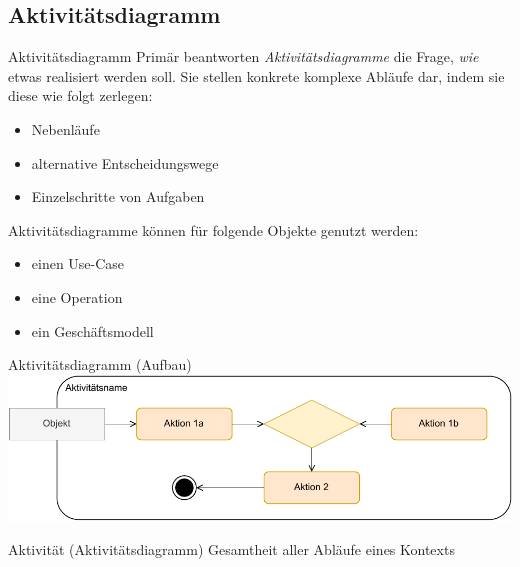 \subsection{Aktivitätsdiagramm}

\begin{defi}{Aktivitätsdiagramm}
    Primär beantworten \emph{Aktivitätsdiagramme} die Frage, \emph{wie} etwas realisiert werden soll.
    Sie stellen konkrete komplexe Abläufe dar, indem sie diese wie folgt zerlegen:
    \begin{itemize}
        \item Nebenläufe
        \item alternative Entscheidungswege
        \item Einzelschritte von Aufgaben
    \end{itemize}

    Aktivitätsdiagramme können für folgende Objekte genutzt werden:
    \begin{itemize}
        \item einen Use-Case
        \item eine Operation
        \item ein Geschäftsmodell
    \end{itemize}
\end{defi}

\begin{defi}{Aktivitätsdiagramm (Aufbau)}
    \includegraphics[width=\textwidth]{includes/figures/defi_diagrams_activity_intro.pdf}
\end{defi}

\begin{defi}{Aktivität (Aktivitätsdiagramm)}
    Gesamtheit aller Abläufe eines Kontexts
\end{defi}

